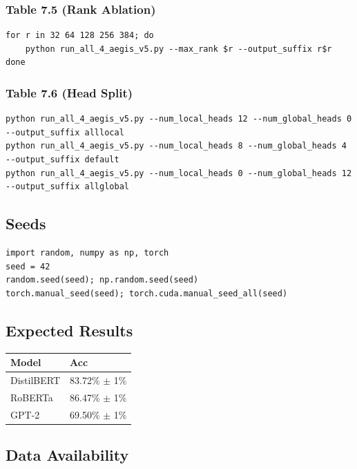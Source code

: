 \subsubsection{Table 7.5 (Rank Ablation)}
\begin{lstlisting}
for r in 32 64 128 256 384; do
    python run_all_4_aegis_v5.py --max_rank $r --output_suffix r$r
done
\end{lstlisting}

\subsubsection{Table 7.6 (Head Split)}
\begin{lstlisting}
python run_all_4_aegis_v5.py --num_local_heads 12 --num_global_heads 0 --output_suffix alllocal
python run_all_4_aegis_v5.py --num_local_heads 8 --num_global_heads 4 --output_suffix default
python run_all_4_aegis_v5.py --num_local_heads 0 --num_global_heads 12 --output_suffix allglobal
\end{lstlisting}

\subsection{Seeds}

\begin{lstlisting}
import random, numpy as np, torch
seed = 42
random.seed(seed); np.random.seed(seed)
torch.manual_seed(seed); torch.cuda.manual_seed_all(seed)
\end{lstlisting}

\subsection{Expected Results}

\begin{table}[H]
\centering
\small
\begin{tabular}{ll}
\toprule
\textbf{Model} & \textbf{Acc} \\
\midrule
DistilBERT & 83.72\% $\pm$ 1\% \\
RoBERTa & 86.47\% $\pm$ 1\% \\
GPT-2 & 69.50\% $\pm$ 1\% \\
\bottomrule
\end{tabular}
\end{table}

\subsection{Data Availability}

